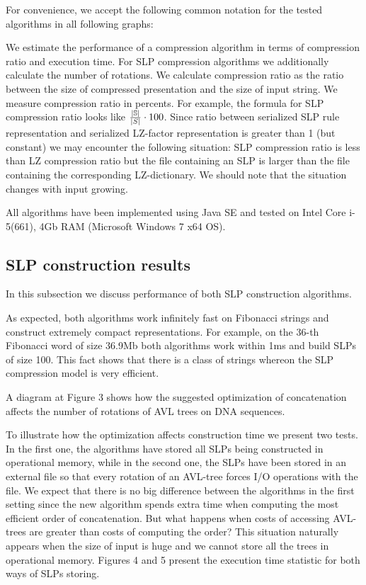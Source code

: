 \documentclass[10pt]{article}
\begin{document}
For convenience, we accept the following common notation for the tested algorithms in all following graphs:

\algorithmNotations

We estimate the performance of a compression algorithm in terms of compression ratio and execution time. For SLP
compression algorithms we additionally calculate the number of rotations. We calculate compression ratio as the ratio
between the size of compressed presentation and the size of input string. We measure compression ratio in percents. For
example, the formula for SLP compression ratio looks like $\frac{|\mathbb{S}|}{|S|} \cdot 100$. Since ratio between
serialized SLP rule representation and serialized LZ-factor representation is greater than 1 (but constant) we may
encounter the following situation: SLP compression ratio is less than LZ compression ratio but the file containing an
SLP is larger than the file containing the corresponding LZ-dictionary. We should note that the situation changes with
input growing.

All algorithms have been implemented using Java SE and tested on Intel Core i-5(661), 4Gb RAM (Microsoft Windows 7 x64
OS).

\subsection{SLP construction results}

In this subsection we discuss performance of both SLP construction algorithms.

As expected, both algorithms work infinitely fast on Fibonacci strings and construct extremely compact representations.
For example, on the 36-th Fibonacci word of size 36.9Mb both algorithms work within 1ms and build SLPs of size 100. This
fact shows that there is a class of strings whereon the SLP compression model is very efficient.

A diagram at Figure 3 shows how the suggested optimization of concatenation affects the number of rotations of AVL trees
on DNA sequences.

To illustrate how the optimization affects  construction time we present two tests. In the first one, the algorithms
have stored all SLPs being constructed in operational memory, while in the second one, the SLPs have been stored in an
external file so that every rotation of an AVL-tree forces I/O operations with the file. We expect that there is no big
difference between the algorithms in the first setting since the new algorithm spends extra time when computing the
most efficient order of concatenation. But what happens when costs of accessing AVL-trees are greater than costs of
computing the order? This situation naturally appears when the size of input is huge and we cannot store all the trees
in operational memory. Figures 4 and 5 present the execution time statistic for both ways of SLPs storing.
\end{document}
